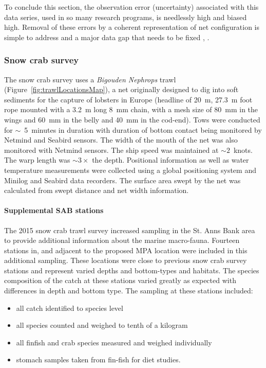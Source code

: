 \documentclass[letterpaper,portrait,11pt]{scrartcl}
\numberwithin{equation}{section}    %
\numberwithin{figure}{section}    %
\numberwithin{table}{section}       %
\begin{document}
To conclude this section, the observation error (uncertainty) associated with this data series, used in so many research programs, is needlessly high and biased high. Removal of these errors by a coherent representation of net configuration is simple to address and a major data gap that needs to be fixed , \parencite{Munden:2017nets}.


\afterpage{\clearpage}
\subsubsection{Snow crab survey}
\label{(se:snowcrab)}

The snow crab survey uses a \textit{Bigouden Nephrops} trawl (Figure~\ref{fig:trawlLocationsMap}), a net originally designed to dig into soft sediments for the capture of lobsters in Europe (headline of 20~m, 27.3~m foot rope mounted with a 3.2~m long 8~mm chain, with a mesh size of 80~mm in the wings and 60~mm in the belly and 40~mm in the cod-end). Tows were conducted for $\sim$~5~minutes in duration with duration of bottom contact being monitored by Netmind and Seabird sensors. The width of the mouth of the net was also monitored with Netmind sensors. The ship speed was maintained at $\sim 2$~knots. The warp length was $\sim 3 \times$ the depth. Positional information as well as water temperature measurements were collected using a global positioning system and Minilog and Seabird data recorders. The surface area swept by the net was calculated from swept distance and net width information.

\paragraph{Supplemental SAB stations}

The 2015 snow crab trawl survey increased sampling in the St. Anns Bank area to provide additional information about the marine macro-fauna. Fourteen stations in, and adjacent to the proposed MPA location were included in this additional sampling. These locations were close to previous snow crab survey stations and represent varied depths and bottom-types and habitats. The species composition of the catch at these stations varied greatly as expected with differences in depth and bottom type. The sampling at these stations included:

\begin{itemize}
  \item all catch identified to species level
  \item all species counted and weighed to tenth of a kilogram
  \item all finfish and crab species measured and weighed individually
  \item stomach samples taken from fin-fish for diet studies.
\end{itemize}
\end{document}
